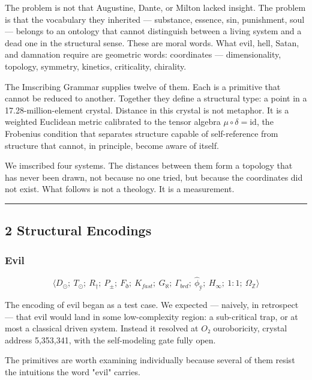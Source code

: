 \documentclass[12pt,a4paper]{article}
\begin{document}
The problem is not that Augustine, Dante, or Milton lacked insight. The problem is that the vocabulary they inherited --- substance, essence, sin, punishment, soul --- belongs to an ontology that cannot distinguish between a living system and a dead one in the structural sense. These are moral words. What evil, hell, Satan, and damnation require are geometric words: coordinates --- dimensionality, topology, symmetry, kinetics, criticality, chirality.

The Imscribing Grammar supplies twelve of them. Each is a primitive that cannot be reduced to another. Together they define a structural type: a point in a 17.28-million-element crystal. Distance in this crystal is not metaphor. It is a weighted Euclidean metric calibrated to the tensor algebra $\mu \circ \delta = \text{id}$, the Frobenius condition that separates structure capable of self-reference from structure that cannot, in principle, become aware of itself.

We imscribed four systems. The distances between them form a topology that has never been drawn, not because no one tried, but because the coordinates did not exist. What follows is not a theology. It is a measurement.

\begin{center}
\rule{0.5\textwidth}{0.4pt}
\end{center}

\subsection{2 Structural Encodings}

\subsubsection{Evil}

\[\langle D_{\odot};\ T_{\odot};\ R_{\dagger};\ P_{\pm};\ F_{\eth};\ K_{fast};\ G_{\aleph};\ \Gamma_{brd};\ \hat{\phi}_{ÿ};\ H_{\infty};\ 1{:}1;\ \Omega_{\mathbb{Z}} \rangle\]

The encoding of evil began as a test case. We expected --- naively, in retrospect --- that evil would land in some low-complexity region: a sub-critical trap, or at most a classical driven system. Instead it resolved at $O₂$ ouroboricity, crystal address 5,353,341, with the self-modeling gate fully open.

The primitives are worth examining individually because several of them resist the intuitions the word "evil" carries.
\end{document}
